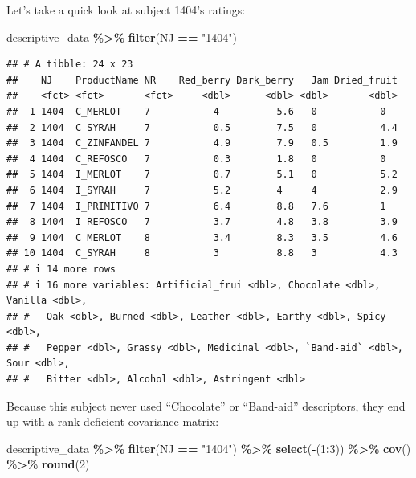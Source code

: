 \documentclass[
]{book}
\newenvironment{Shaded}{\begin{snugshade}}{\end{snugshade}}
\newcommand{\DecValTok}[1]{\textcolor[rgb]{0.00,0.00,0.81}{#1}}
\newcommand{\FunctionTok}[1]{\textcolor[rgb]{0.13,0.29,0.53}{\textbf{#1}}}
\newcommand{\NormalTok}[1]{#1}
\newcommand{\SpecialCharTok}[1]{\textcolor[rgb]{0.81,0.36,0.00}{\textbf{#1}}}
\newcommand{\StringTok}[1]{\textcolor[rgb]{0.31,0.60,0.02}{#1}}
\begin{document}
Let's take a quick look at subject 1404's ratings:

\begin{Shaded}
\begin{Highlighting}[]
\NormalTok{descriptive\_data }\SpecialCharTok{\%\textgreater{}\%}
  \FunctionTok{filter}\NormalTok{(NJ }\SpecialCharTok{==} \StringTok{"1404"}\NormalTok{)}
\end{Highlighting}
\end{Shaded}

\begin{verbatim}
## # A tibble: 24 x 23
##    NJ    ProductName NR    Red_berry Dark_berry   Jam Dried_fruit
##    <fct> <fct>       <fct>     <dbl>      <dbl> <dbl>       <dbl>
##  1 1404  C_MERLOT    7           4          5.6   0           0  
##  2 1404  C_SYRAH     7           0.5        7.5   0           4.4
##  3 1404  C_ZINFANDEL 7           4.9        7.9   0.5         1.9
##  4 1404  C_REFOSCO   7           0.3        1.8   0           0  
##  5 1404  I_MERLOT    7           0.7        5.1   0           5.2
##  6 1404  I_SYRAH     7           5.2        4     4           2.9
##  7 1404  I_PRIMITIVO 7           6.4        8.8   7.6         1  
##  8 1404  I_REFOSCO   7           3.7        4.8   3.8         3.9
##  9 1404  C_MERLOT    8           3.4        8.3   3.5         4.6
## 10 1404  C_SYRAH     8           3          8.8   3           4.3
## # i 14 more rows
## # i 16 more variables: Artificial_frui <dbl>, Chocolate <dbl>, Vanilla <dbl>,
## #   Oak <dbl>, Burned <dbl>, Leather <dbl>, Earthy <dbl>, Spicy <dbl>,
## #   Pepper <dbl>, Grassy <dbl>, Medicinal <dbl>, `Band-aid` <dbl>, Sour <dbl>,
## #   Bitter <dbl>, Alcohol <dbl>, Astringent <dbl>
\end{verbatim}

Because this subject never used ``Chocolate'' or ``Band-aid'' descriptors, they end up with a rank-deficient covariance matrix:

\begin{Shaded}
\begin{Highlighting}[]
\NormalTok{descriptive\_data }\SpecialCharTok{\%\textgreater{}\%}
  \FunctionTok{filter}\NormalTok{(NJ }\SpecialCharTok{==} \StringTok{"1404"}\NormalTok{) }\SpecialCharTok{\%\textgreater{}\%}
  \FunctionTok{select}\NormalTok{(}\SpecialCharTok{{-}}\NormalTok{(}\DecValTok{1}\SpecialCharTok{:}\DecValTok{3}\NormalTok{)) }\SpecialCharTok{\%\textgreater{}\%}
  \FunctionTok{cov}\NormalTok{() }\SpecialCharTok{\%\textgreater{}\%}
  \FunctionTok{round}\NormalTok{(}\DecValTok{2}\NormalTok{)}
\end{Highlighting}
\end{Shaded}
\end{document}
